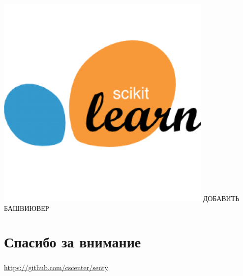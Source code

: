 \documentclass[t]{beamer}
\begin{document}
\begin{frame}
		\includegraphics[scale = 0.2]{images/scikit_learn.png}
		ДОБАВИТЬ БАШВИЮВЕР
	\end{frame}
	
	
	
	
	\section{Спасибо за внимание}
	
	\begin{frame}
		\frametitle{\insertsection}
		\href{https://github.com/cscenter/senty}{https://github.com/cscenter/senty}
	\end{frame}
	
	
	
	
	
	
	
	
	
	
\end{document}
